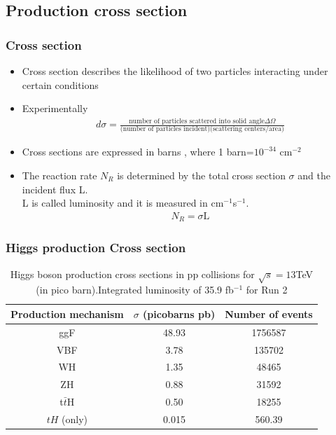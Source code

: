 \documentclass[11pt]{beamer}
\begin{document}
\begin{frame}
\subsection{Production cross section}
\frametitle{Cross section}
\begin{itemize}
\item Cross section describes the likelihood of two particles interacting under certain conditions\cite{1}\cite{6}
\item Experimentally
\begin{align}
d\sigma=\frac{\text{number of particles scattered into solid angle} \Delta\Omega}{\text{(number of particles incident)(scattering centers/area)}}
\end{align}
\item Cross sections are expressed in barns , where 1 barn=$10^{-34}$ cm$^{-2}$ 
\item The reaction rate $N_R$ is determined by the total cross section $\sigma$ and the incident flux L.\\
L is called luminosity and it is measured in cm$^{-1}$s$^{-1}$.\cite{6}
\begin{align}
N_R=\sigma \text{L}
\end{align}
\end{itemize}
\end{frame}



\begin{frame}
\frametitle{Higgs production Cross section}
\begin{table}
	\caption*{Higgs boson production cross sections  in pp collisions for $\sqrt{s}=13$TeV  (in
		pico barn).Integrated luminosity of 35.9 fb$^{-1}$ for Run 2\footnotemark}
	\begin{tabular}{|c|c|c|}
		\hline
		Production mechanism &
		$\sigma$ (picobarns pb)
		&Number of events \\
		\hline
		ggF &
		48.93 &
		1756587\\
		\hline
		VBF &
		3.78&
		135702\\
		\hline
		WH & 1.35 & 48465\\
		\hline
		ZH &0.88 & 31592\\
		\hline
		t$\bar{t}$H &
		0.50&
		18255\\
		\hline
		$tH$	(only)&
		0.015&
		560.39\\
		\hline
	\end{tabular}
\end{table}


\end{frame}
\end{document}
